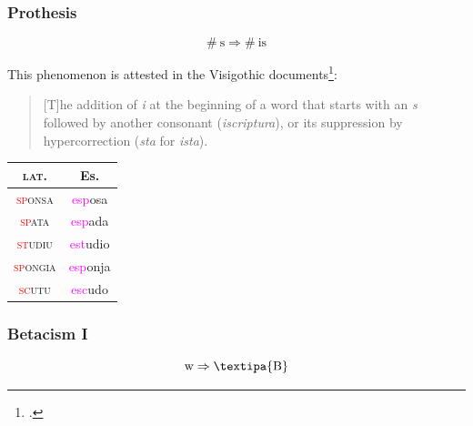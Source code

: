\documentclass{report}[12pt]
\begin{document}
\subsubsection{Prothesis}

\begin{tcolorbox}
  \[ \#\ \text{s} \Rightarrow \#\ \text{is} \]
\end{tcolorbox}

This phenomenon is attested in the Visigothic documents\footcite[p.~159]{latin_palaeography}:
\begin{quote}
  [T]he addition of \emph{i} at the beginning of a word that starts with an \emph{s} followed by another consonant (\emph{iscriptura}), or its suppression by hypercorrection (\emph{sta} for \emph{ista}).
\end{quote}

\begin{tabular}{c c}
  \textsc{lat.} & Es. \\
  \hline
  \textsc{\textcolor{red}{sp}onsa} & \textcolor{magenta}{esp}osa \\
  \textsc{\textcolor{red}{sp}ata} & \textcolor{magenta}{esp}ada \\
  \textsc{\textcolor{red}{st}udiu} & \textcolor{magenta}{est}udio \\
  \textsc{\textcolor{red}{sp}ongia} & \textcolor{magenta}{esp}onja \\
  \textsc{\textcolor{red}{sc}utu} & \textcolor{magenta}{esc}udo \\
\end{tabular}

\subsubsection*{Betacism I}

\begin{tcolorbox}
  \[ \text{w} \Rightarrow \text{\textipa{B}} \]
\end{tcolorbox}
\end{document}
